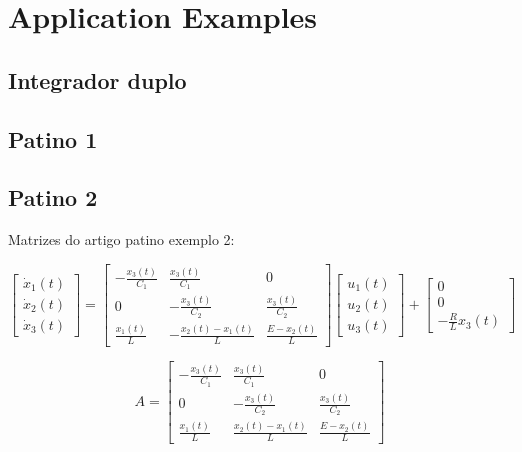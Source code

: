 \section{Application Examples}

\subsection{Integrador duplo}
\subsection{Patino 1}
\subsection{Patino 2}

Matrizes do artigo patino exemplo 2:

\begin{equation}
	\left[ \begin{array}{c}
		\dot{x}_1(t) \\
		\dot{x}_2(t) \\
		\dot{x}_3(t)
	\end{array} \right]
	=
	\left[ \begin{array}{ccc}
		-\frac{x_3(t)}{C_1} & \frac{x_3(t)}{C_1} & 0 \\
		0 & -\frac{x_3(t)}{C_2} & \frac{x_3(t)}{C_2} \\
		\frac{x_1(t)}{L} & -\frac{x_2(t) - x_1(t)}{L} & \frac{E - x_2(t)}{L}
	\end{array} \right]
	\left[ \begin{array}{c}
		u_1(t) \\
		u_2(t) \\
		u_3(t)
	\end{array} \right]
	+
	\left[ \begin{array}{c}
		0 \\
		0 \\
		-\frac{R}{L}x_3(t)
	\end{array} \right]
\end{equation}

\begin{equation}
	A = 
	\left[
		\begin{array}{ccc}
			-\frac{x_3(t)}{C_1} & \frac{x_3(t)}{C_1} & 0 \\
			0 & -\frac{x_3(t)}{C_2} & \frac{x_3(t)}{C_2} \\
			\frac{x_1(t)}{L} & \frac{x_2(t) - x_1(t)}{L} & \frac{E-x_2(t)}{L}
		\end{array}
	\right]
\end{equation}

